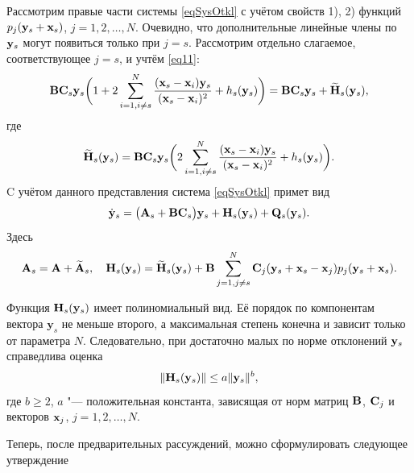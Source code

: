 \smallskip

Рассмотрим правые части системы \eqref{eqSysOtkl} с учётом
свойств 1), 2) функций $p_j({\bf y}_s+{\bf x}_s)$, $j=1, 2, \dots, N$.
Очевидно, что дополнительные линейные члены по ${\bf y}_s$ могут
появиться только при $j=s$. 
Рассмотрим отдельно слагаемое, соответствующее $j=s$, и учтём \eqref{eq11}:
$$
{\bf B}{\bf C}_s{\bf y}_s
\biggl(1+2\sum^{N}_{i=1,i\neq{s}}{({\bf x}_s-{\bf x}_i){\bf y}_s\over({\bf x}_s-{\bf x}_i)^2}+h_s({\bf y}_s)\biggr)=
{\bf B}{\bf C}_s{\bf y}_s+\mathbf{\widetilde{H}}_s({\bf y}_s),
$$
где
$$
\mathbf{\widetilde{H}}_s({\bf y}_s)={\bf B}{\bf C}_s{\bf y}_s
\biggl(2\sum^N_{i=1,i\neq{s}}{({\bf x}_s-{\bf x}_i){\bf y}_s\over({\bf x}_s-
{\bf x}_i)^2}+h_s({\bf y}_s)\biggr). 
$$
C учётом данного представления система \eqref{eqSysOtkl} примет
вид
\begin{equation}
\dot{\bf y}_s=\bigl({\bf A}_s+{\bf B}{\bf C}_s\bigr){\bf y}_s+\mathbf{H}_s({\bf y}_s)+
{\bf Q}_s({\bf y}_s). \label{eq12}
\end{equation}
Здесь
$$
{\bf A}_s={\bf A}+\widetilde{{\bf A}}_s, \quad
\mathbf{H}_s({\bf y}_s)=\mathbf{\widetilde{H}}_s({\bf y}_s)+{\bf B}\sum^N_{j=1,j\neq{s}}
{\bf C}_j({\bf y}_s+{\bf x}_s-{\bf x}_j)p_j({\bf y}_s+{\bf x}_s). 
$$

Функция $\mathbf{H}_s({\bf y}_s)$ имеет полиномиальный вид. Её порядок
по компонентам вектора $\mathbf{y}_s$ не меньше второго, а
максимальная степень конечна и зависит только от параметра $N$.
Следовательно, при достаточно малых по норме отклонений ${\bf y}_s$
справедлива оценка
\begin{equation}
\|\mathbf{H}_s({\bf y}_s)\|\leq{a}\|{\bf y}_s\|^b,\label{eq121}
\end{equation}
где $b\geq{2}$, $a$ "--- положительная константа, зависящая от норм
матриц ${\bf B}$, ${\bf C}_j$ и векторов ${\bf x}_j$, $j=1, 2, \dots, N$.

Теперь, после предварительных рассуждений, можно сформулировать
следующее утверждение

